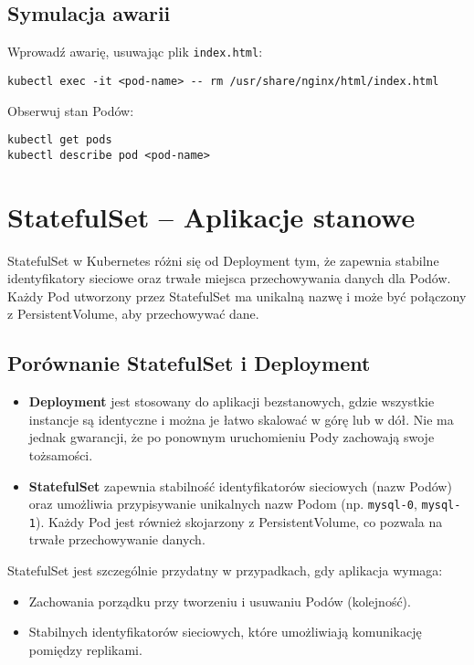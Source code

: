 \documentclass{article}
\begin{document}
\subsection{Symulacja awarii}
Wprowadź awarię, usuwając plik \texttt{index.html}:
\begin{verbatim}
kubectl exec -it <pod-name> -- rm /usr/share/nginx/html/index.html
\end{verbatim}

Obserwuj stan Podów:
\begin{verbatim}
kubectl get pods
kubectl describe pod <pod-name>
\end{verbatim}


\section{StatefulSet – Aplikacje stanowe}

StatefulSet w Kubernetes różni się od Deployment tym, że zapewnia stabilne identyfikatory sieciowe oraz trwałe miejsca przechowywania danych dla Podów. Każdy Pod utworzony przez StatefulSet ma unikalną nazwę i może być połączony z PersistentVolume, aby przechowywać dane.

\subsection{Porównanie StatefulSet i Deployment}
\begin{itemize}
    \item \textbf{Deployment} jest stosowany do aplikacji bezstanowych, gdzie wszystkie instancje są identyczne i można je łatwo skalować w górę lub w dół. Nie ma jednak gwarancji, że po ponownym uruchomieniu Pody zachowają swoje tożsamości.
    \item \textbf{StatefulSet} zapewnia stabilność identyfikatorów sieciowych (nazw Podów) oraz umożliwia przypisywanie unikalnych nazw Podom (np. \texttt{mysql-0}, \texttt{mysql-1}). Każdy Pod jest również skojarzony z PersistentVolume, co pozwala na trwałe przechowywanie danych.
\end{itemize}

StatefulSet jest szczególnie przydatny w przypadkach, gdy aplikacja wymaga:
\begin{itemize}
    \item Zachowania porządku przy tworzeniu i usuwaniu Podów (kolejność).
    \item Stabilnych identyfikatorów sieciowych, które umożliwiają komunikację pomiędzy replikami.
\end{itemize}
\end{document}
